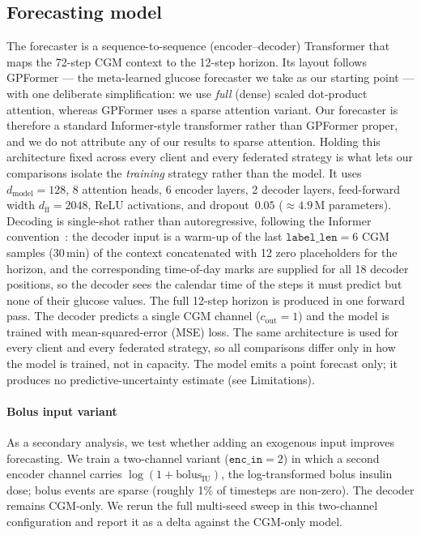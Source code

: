 \documentclass[10pt,letterpaper]{article}
\begin{document}
\subsection*{Forecasting model}

The forecaster is a sequence-to-sequence (encoder--decoder) Transformer that maps
the 72-step CGM context to the 12-step horizon. Its layout follows GPFormer
\cite{zhu2024gpformer} --- the meta-learned glucose forecaster we take as our
starting point --- with one deliberate simplification: we use \emph{full}
(dense) scaled dot-product attention, whereas GPFormer uses a sparse attention
variant. Our forecaster is therefore a standard Informer-style transformer rather
than GPFormer proper, and we do not attribute any of our results to sparse
attention. Holding this architecture fixed across every client and every federated
strategy is what lets our comparisons isolate the \emph{training} strategy rather
than the model. It uses
$d_{\text{model}}=128$, 8 attention heads, 6 encoder layers, 2 decoder layers,
feed-forward width $d_{\text{ff}}=2048$, ReLU activations, and dropout~$0.05$
($\approx 4.9$\,M parameters). Decoding is single-shot rather than
autoregressive, following the Informer convention~\cite{zhou2021informer}: the
decoder input is a warm-up of the last $\texttt{label\_len}=6$ CGM samples
(30\,min) of the context concatenated with 12 zero placeholders for the horizon,
and the corresponding time-of-day marks are supplied for all 18 decoder
positions, so the decoder sees the calendar time of the steps it must predict but
none of their glucose values. The full 12-step horizon is produced in one forward
pass. The decoder predicts a single CGM channel ($c_{\text{out}}=1$) and the
model is trained with mean-squared-error (MSE) loss. The same architecture is
used for every client and every federated strategy, so all comparisons differ
only in how the model is trained, not in capacity. The model emits a point
forecast only; it produces no predictive-uncertainty estimate (see Limitations).

\paragraph{Bolus input variant}
As a secondary analysis, we test whether adding an exogenous input improves
forecasting. We train a two-channel variant ($\texttt{enc\_in}=2$) in which a
second encoder channel carries $\log(1+\mathrm{bolus}_{\mathrm{IU}})$, the
log-transformed bolus insulin dose; bolus events are sparse (roughly 1\% of
timesteps are non-zero). The decoder remains CGM-only. We rerun the full
multi-seed sweep in this two-channel configuration and report it as a delta
against the CGM-only model.
\end{document}
